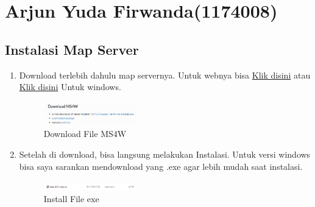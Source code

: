 \section{Arjun Yuda Firwanda(1174008)}
\subsection{Instalasi Map Server}
\begin{enumerate}
    \item Download terlebih dahulu map servernya. Untuk webnya bisa \href{https://mapserver.org/}{Klik disini} atau \href{https://ms4w.com/}{Klik disini} Untuk windows.
    \hfill\break
    \begin{figure}[H]
		\includegraphics[width=4cm]{figures/1174008/4/1.png}
		\centering
		\caption{Download File MS4W}
    \end{figure}
    \hfill\break

    \item Setelah di download, bisa langsung melakukan Instalasi. Untuk versi windows bisa saya sarankan mendownload yang .exe agar lebih mudah saat instalasi.
    \hfill\break
    \begin{figure}[H]
		\includegraphics[width=4cm]{figures/1174008/4/2.png}
		\centering
		\caption{Install File exe}
    \end{figure}
    \hfill\break

\end{enumerate}


